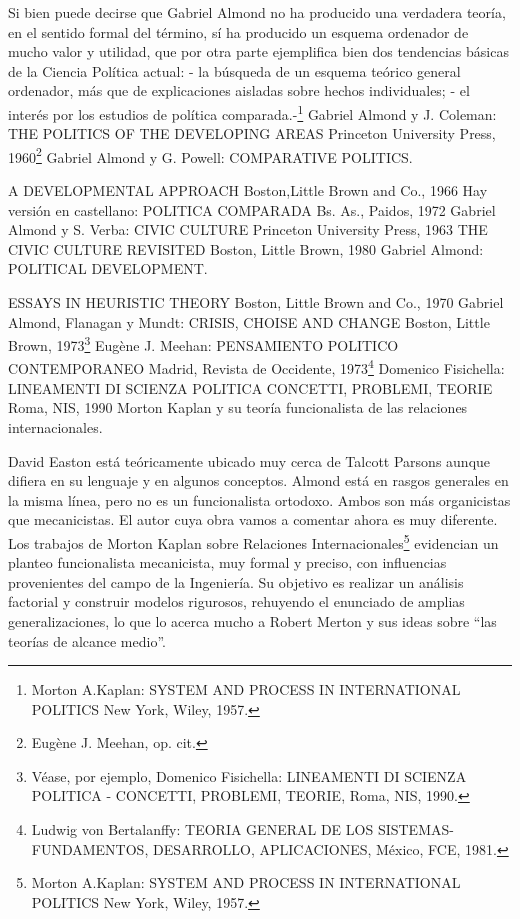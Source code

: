 \documentclass[
]{book}
\begin{document}
Si bien puede decirse que Gabriel Almond no ha producido una verdadera teoría, en el sentido formal del término, sí ha producido un esquema ordenador de mucho valor y utilidad, que por otra parte ejemplifica bien dos tendencias básicas de la Ciencia Política actual: - la búsqueda de un esquema teórico general ordenador, más que de explicaciones aisladas sobre hechos individuales; - el interés por los estudios de política comparada.-\footnote{Morton A.Kaplan: SYSTEM AND PROCESS IN INTERNATIONAL POLITICS New York, Wiley, 1957.} Gabriel Almond y J. Coleman: THE POLITICS OF THE DEVELOPING AREAS Princeton University Press, 1960\footnote{Eugène J. Meehan, op. cit.} Gabriel Almond y G. Powell: COMPARATIVE POLITICS.

A DEVELOPMENTAL APPROACH Boston,Little Brown and Co., 1966 Hay versión en castellano: POLITICA COMPARADA Bs. As., Paidos, 1972 Gabriel Almond y S. Verba: CIVIC CULTURE Princeton University Press, 1963 THE CIVIC CULTURE REVISITED Boston, Little Brown, 1980 Gabriel Almond: POLITICAL DEVELOPMENT.

ESSAYS IN HEURISTIC THEORY Boston, Little Brown and Co., 1970 Gabriel Almond, Flanagan y Mundt: CRISIS, CHOISE AND CHANGE Boston, Little Brown, 1973\footnote{Véase, por ejemplo, Domenico Fisichella: LINEAMENTI DI SCIENZA POLITICA - CONCETTI, PROBLEMI, TEORIE, Roma, NIS, 1990.} Eugène J. Meehan: PENSAMIENTO POLITICO CONTEMPORANEO Madrid, Revista de Occidente, 1973\footnote{Ludwig von Bertalanffy: TEORIA GENERAL DE LOS SISTEMAS- FUNDAMENTOS, DESARROLLO, APLICACIONES, México, FCE, 1981.} Domenico Fisichella: LINEAMENTI DI SCIENZA POLITICA CONCETTI, PROBLEMI, TEORIE Roma, NIS, 1990 Morton Kaplan y su teoría funcionalista de las relaciones internacionales.

David Easton está teóricamente ubicado muy cerca de Talcott Parsons aunque difiera en su lenguaje y en algunos conceptos. Almond está en rasgos generales en la misma línea, pero no es un funcionalista ortodoxo. Ambos son más organicistas que mecanicistas. El autor cuya obra vamos a comentar ahora es muy diferente. Los trabajos de Morton Kaplan sobre Relaciones Internacionales\footnote{Morton A.Kaplan: SYSTEM AND PROCESS IN INTERNATIONAL POLITICS New York, Wiley, 1957.} evidencian un planteo funcionalista mecanicista, muy formal y preciso, con influencias provenientes del campo de la Ingeniería. Su objetivo es realizar un análisis factorial y construir modelos rigurosos, rehuyendo el enunciado de amplias generalizaciones, lo que lo acerca mucho a Robert Merton y sus ideas sobre ``las teorías de alcance medio''.
\end{document}
